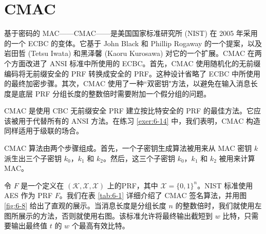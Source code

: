 \section{CMAC}\label{sec:6-10}

基于密码的 MAC——CMAC——是美国国家标准研究所 (NIST) 在 2005 年采用的一个 ECBC 的变体。它基于 John Black 和 Phillip Rogaway 的一个提案，以及岩田哲 (Tetsu Iwata) 和黑泽馨 (Kaoru Kurosawa) 对它的一个扩展。CMAC 在两个方面改进了 ANSI 标准中所使用的 ECBC。首先，CMAC 使用随机化的无前缀编码将无前缀安全的 PRF 转换成安全的 PRF。这种设计省略了 ECBC 中所使用的最终加密步骤。其次，CMAC 使用了一种``双密钥"方法，以避免在输入消息长度是底层 PRF 分组长度的整数倍时需要附加一个假分组的问题。

CMAC 是使用 CBC 无前缀安全 PRF 建立按比特安全的 PRF 的最佳方法。它应该被用于代替所有的 ANSI 方法。在练习 \ref{exer:6-14} 中，我们表明，CMAC 构造同样适用于级联的场合。

\begin{snote}
CMAC 算法由两个步骤组成。首先，一个子密钥生成算法被用来从 MAC 密钥 $k$ 派生出三个子密钥 $k_0$，$k_1$ 和 $k_2$。然后，这三个子密钥 $k_0$，$k_1$ 和 $k_2$ 被用来计算 MAC。

令 $F$ 是一个定义在 $(\mathcal{K},\mathcal{X},\mathcal{X})$ 上的PRF，其中 $\mathcal{X}=\{0,1\}^n$。NIST 标准使用 AES 作为 PRF $F$。我们在表 \ref{tab:6-1} 详细介绍了 CMAC 签名算法，并用图 \ref{fig:6-8} 给出了直观的展示。当消息长度是分组长度 $n$ 的整数倍时，我们就使用左图所展示的方法，否则就使用右图。该标准允许将最终输出截短到 $w$ 比特，只需要输出最终值 $t$ 的 $w$ 个最高有效比特。
\end{snote}

